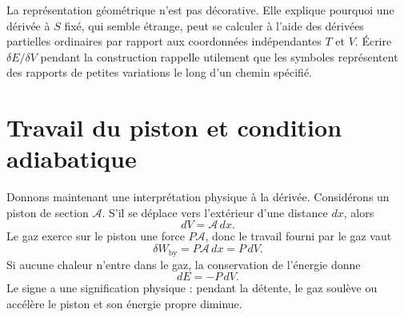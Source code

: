 La représentation géométrique n’est pas décorative. Elle explique pourquoi une dérivée à \(S\) fixé, qui semble étrange, peut se calculer à l’aide des dérivées partielles ordinaires par rapport aux coordonnées indépendantes \(T\) et \(V\). Écrire \(\delta E/\delta V\) pendant la construction rappelle utilement que les symboles représentent des rapports de petites variations le long d’un chemin spécifié.

\begin{classroomqa}\end{classroomqa}

\begin{classroomqa}\end{classroomqa}

\section{Travail du piston et condition adiabatique}

Donnons maintenant une interprétation physique à la dérivée. Considérons un piston de section \(\mathcal A\). S’il se déplace vers l’extérieur d’une distance \(dx\), alors \begin{equation}
 dV=\mathcal A\,dx.
 \label{eq:sm5-piston-volume}
\end{equation} Le gaz exerce sur le piston une force \(P\mathcal A\), donc le travail fourni par le gaz vaut \begin{equation}
 \delta W_{\mathrm{by}}=P\mathcal A\,dx=P\,dV.
 \label{eq:sm5-piston-work}
\end{equation} Si aucune chaleur n’entre dans le gaz, la conservation de l’énergie donne \begin{equation}
 dE=-P\,dV.
 \label{eq:sm5-adiabatic-work}
\end{equation} Le signe a une signification physique : pendant la détente, le gaz soulève ou accélère le piston et son énergie propre diminue.

